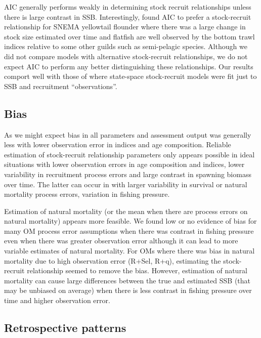 \documentclass[
  12pt,
]{article}
\begin{document}
AIC generally performs weakly in determining stock recruit relationships
unless there is large contrast in SSB. Interestingly,
\citet{milleretal16} found AIC to prefer a stock-recruit relationship
for SNEMA yellowtail flounder where there was a large change in stock
size estimated over time and flatfish are well observed by the bottom
trawl indices relative to some other guilds such as semi-pelagic
species. Although we did not compare models with alternative
stock-recruit relationships, we do not expect AIC to perform any better
distinguishing these relationships. Our results comport well with those
of \citet{devalpinehastings02} where state-space stock-recruit models
were fit just to SSB and recruitment ``observations''.

\hypertarget{bias-2}{%
\subsection*{Bias}\label{bias-2}}

As we might expect bias in all parameters and assessment output was
generally less with lower observation error in indices and age
composition. Reliable estimation of stock-recruit relationship
parameters only appears possible in ideal situations with lower
observation errors in age composition and indices, lower variability in
recruitment process errors and large contrast in spawning biomass over
time. The latter can occur in with larger variability in survival or
natural mortality process errors, variation in fishing pressure.

Estimation of natural mortality (or the mean when there are process
errors on natural mortality) appears more feasible. We found low or no
evidence of bias for many OM process error assumptions when there was
contrast in fishing pressure even when there was greater observation
error although it can lead to more variable estimates of natural
mortality. For OMs where there was bias in natural mortality due to high
observation error (R+Sel, R+q), estimating the stock-recruit
relationship seemed to remove the bias. However, estimation of natural
mortality can cause large differences between the true and estimated SSB
(that may be unbiased on average) when there is less contrast in fishing
pressure over time and higher observation error.

\hypertarget{retrospective-patterns}{%
\subsection*{Retrospective patterns}\label{retrospective-patterns}}
\end{document}
